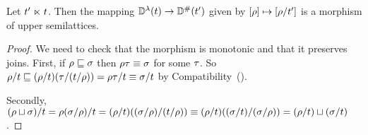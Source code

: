\begin{corollary}
Let $t' \mathrel{\ltimes} t$.
Then the mapping $\mathbb{D}^{\lambda}(t) \to \mathbb{D}^{\mathtt{\#}}(t')$
given by ${[\rho]} \mapsto {[\rho/t']}$ is a morphism of upper
semilattices.
\end{corollary}
\begin{proof}
We need to check that the morphism is monotonic and that it preserves joins.
First, if $\rho \sqsubseteq \sigma$ 
then $\rho\tau \equiv \sigma$ for some $\tau$.
So $\rho/t \sqsubseteq (\rho/t)(\tau/(t/\rho)) = \rho\tau/t \equiv \sigma/t$
by Compatibility~().

Secondly,
$
  (\rho \sqcup \sigma)/t =
  \rho(\sigma/\rho)/t =
  (\rho/t)((\sigma/\rho)/(t/\rho)) \equiv
  (\rho/t)((\sigma/t)/(\sigma/\rho)) =
  (\rho/t) \sqcup (\sigma/t)
$.
\end{proof}

